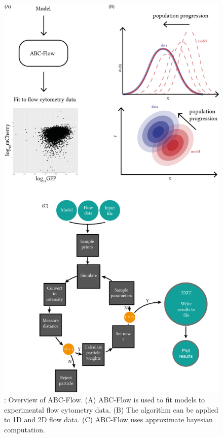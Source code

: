 \begin{figure}[htbp]
	\begin{center}
		\includegraphics[scale=0.7]{../../chapters/chapterABCFlow/images/abc-flow-overv.png}
		\caption[LoF caption]{\label{fig:abcflow-overv}: Overview of ABC-Flow. (A) ABC-Flow is used to fit models to experimental flow cytometry data. (B) The algorithm can be applied to 1D and 2D flow data. (C) ABC-Flow uses approximate bayesian computation.}
	\end{center}
\end{figure}

